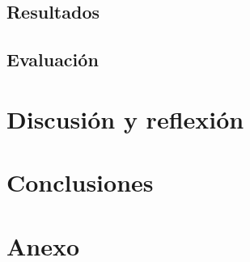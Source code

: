\documentclass[12pt]{article}
\begin{document}
\subsection{Resultados}
\subsection{Evaluación}



\section{Discusión y reflexión}
\section{Conclusiones}
\section{Anexo}
\end{document}
